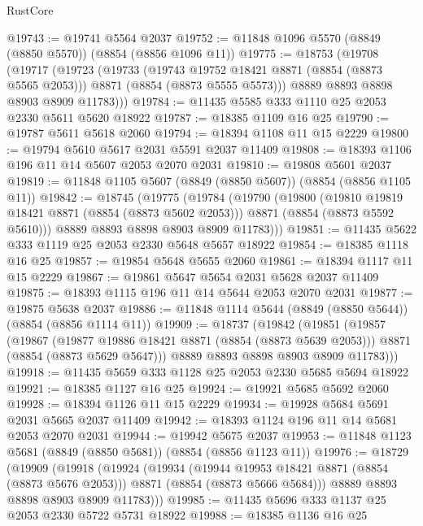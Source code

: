 \begin{lexlean}{RustCore}
\begin{coremodule}
@19743 := @19741 @5564 @2037
@19752 := @11848 @1096 @5570 (@8849 (@8850 @5570)) (@8854 (@8856 @1096 @11))
@19775 := @18753
    (@19708
      (@19717
        (@19723
          (@19733
            (@19743 @19752 @18421 @8871 (@8854 (@8873 @5565 @2053)))
            @8871
            (@8854 (@8873 @5555 @5573)))
          @8889
          @8893
          @8898
          @8903
          @8909
          @11783)))
@19784 := @11435 @5585 @333 @1110 @25 @2053 @2330 @5611 @5620 @18922
@19787 := @18385 @1109 @16 @25
@19790 := @19787 @5611 @5618 @2060
@19794 := @18394 @1108 @11 @15 @2229
@19800 := @19794 @5610 @5617 @2031 @5591 @2037 @11409
@19808 := @18393 @1106 @196 @11 @14 @5607 @2053 @2070 @2031
@19810 := @19808 @5601 @2037
@19819 := @11848 @1105 @5607 (@8849 (@8850 @5607)) (@8854 (@8856 @1105 @11))
@19842 := @18745
    (@19775
      (@19784
        (@19790
          (@19800
            (@19810 @19819 @18421 @8871 (@8854 (@8873 @5602 @2053)))
            @8871
            (@8854 (@8873 @5592 @5610)))
          @8889
          @8893
          @8898
          @8903
          @8909
          @11783)))
@19851 := @11435 @5622 @333 @1119 @25 @2053 @2330 @5648 @5657 @18922
@19854 := @18385 @1118 @16 @25
@19857 := @19854 @5648 @5655 @2060
@19861 := @18394 @1117 @11 @15 @2229
@19867 := @19861 @5647 @5654 @2031 @5628 @2037 @11409
@19875 := @18393 @1115 @196 @11 @14 @5644 @2053 @2070 @2031
@19877 := @19875 @5638 @2037
@19886 := @11848 @1114 @5644 (@8849 (@8850 @5644)) (@8854 (@8856 @1114 @11))
@19909 := @18737
    (@19842
      (@19851
        (@19857
          (@19867
            (@19877 @19886 @18421 @8871 (@8854 (@8873 @5639 @2053)))
            @8871
            (@8854 (@8873 @5629 @5647)))
          @8889
          @8893
          @8898
          @8903
          @8909
          @11783)))
@19918 := @11435 @5659 @333 @1128 @25 @2053 @2330 @5685 @5694 @18922
@19921 := @18385 @1127 @16 @25
@19924 := @19921 @5685 @5692 @2060
@19928 := @18394 @1126 @11 @15 @2229
@19934 := @19928 @5684 @5691 @2031 @5665 @2037 @11409
@19942 := @18393 @1124 @196 @11 @14 @5681 @2053 @2070 @2031
@19944 := @19942 @5675 @2037
@19953 := @11848 @1123 @5681 (@8849 (@8850 @5681)) (@8854 (@8856 @1123 @11))
@19976 := @18729
    (@19909
      (@19918
        (@19924
          (@19934
            (@19944 @19953 @18421 @8871 (@8854 (@8873 @5676 @2053)))
            @8871
            (@8854 (@8873 @5666 @5684)))
          @8889
          @8893
          @8898
          @8903
          @8909
          @11783)))
@19985 := @11435 @5696 @333 @1137 @25 @2053 @2330 @5722 @5731 @18922
@19988 := @18385 @1136 @16 @25

\end{coremodule}
\end{lexlean}

